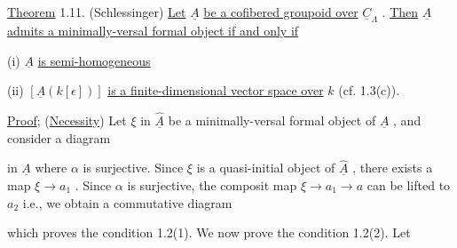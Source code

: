 \underline{Theorem} 1.11. (Schlessinger) \underline{Let} $\underline{A}$ \underline{be a cofibered groupoid over} $\underline{C}_{\Lambda}$ . \underline{Then} $\underline{A}$
\underline{admits a minimally-versal formal object if and only if}

  (i)  $\underline{A}$  \underline{is semi-homogeneous}

  (ii)  $[\underline{A}(k[\epsilon])]$  \underline{is a finite-dimensional vector space over}  $k$  (cf. 1.3(c)).

\underline{Proof}; (\underline{Necessity}) Let $\xi$ in $\hat{\underline{A}}$ be a minimally-versal formal object of $\underline{A}$ , and consider a diagram

\begin{center}
\end{center}
in $\underline{A}$ where $\alpha$ is surjective. Since $\xi$ is a quasi-initial object of $\hat{\underline{A}}$ , there exists a map $\xi \to a_1$ . Since $\alpha$ is surjective, the composit map $\xi \to a_1 \to a$ can be lifted to $a_2$ i.e., we obtain a commutative diagram

\begin{center}
\end{center}
which proves the condition 1.2(1). We now prove the condition 1.2(2). Let

